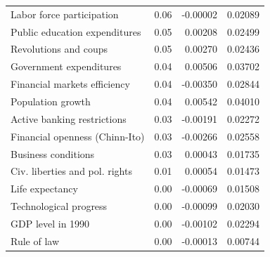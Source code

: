 \documentclass[a4paper,11pt]{article}
\begin{document}
\begin{table}[!ht]
\begin{tabular}{lrrr}
  Labor force participation & 0.06 & -0.00002 & 0.02089 \\ 
  Public education expenditures & 0.05 & 0.00208 & 0.02499 \\ 
  Revolutions and coups & 0.05 & 0.00270 & 0.02436 \\ 
  Government expenditures & 0.04 & 0.00506 & 0.03702 \\ 
  Financial markets efficiency & 0.04 & -0.00350 & 0.02844 \\ 
  Population growth & 0.04 & 0.00542 & 0.04010 \\ 
  Active banking restrictions & 0.03 & -0.00191 & 0.02272 \\ 
  Financial openness (Chinn-Ito) & 0.03 & -0.00266 & 0.02558 \\ 
  Business conditions & 0.03 & 0.00043 & 0.01735 \\ 
  Civ. liberties and pol. rights & 0.01 & 0.00054 & 0.01473 \\ 
  Life expectancy & 0.00 & -0.00069 & 0.01508 \\ 
  Technological progress & 0.00 & -0.00099 & 0.02030 \\ 
  GDP level in 1990 & 0.00 & -0.00102 & 0.02294 \\ 
  Rule of law & 0.00 & -0.00013 & 0.00744 \\
  \midrule
  \bottomrule
\end{tabular}
\end{table}

\clearpage
\end{document}

